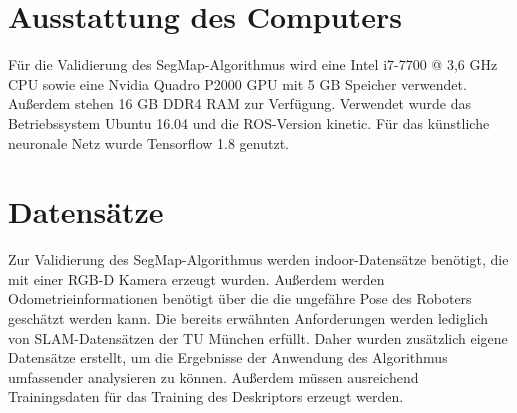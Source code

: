 
\section[Ausstattung des Computers (Kopp)]{Ausstattung des Computers}

Für die Validierung des SegMap-Algorithmus wird eine Intel i7-7700 @ 3,6 GHz CPU sowie eine Nvidia Quadro P2000 GPU mit 5 GB Speicher verwendet. Außerdem stehen 16 GB DDR4 RAM zur Verfügung. Verwendet wurde das Betriebssystem Ubuntu 16.04 und die ROS-Version kinetic. Für das künstliche neuronale Netz wurde Tensorflow 1.8 genutzt. 

\section[Datensätze (Schmelzer)]{Datensätze}
\label{sec:Datensatz}

Zur Validierung des SegMap-Algorithmus werden indoor-Datensätze benötigt, die mit einer RGB-D Kamera erzeugt wurden. Außerdem werden Odometrieinformationen benötigt über die die ungefähre Pose des Roboters geschätzt werden kann. Die bereits erwähnten Anforderungen werden lediglich von SLAM-Datensätzen der TU München erfüllt. Daher wurden zusätzlich eigene Datensätze erstellt, um die Ergebnisse der Anwendung des Algorithmus umfassender analysieren zu können. Außerdem müssen ausreichend Trainingsdaten für das Training des Deskriptors erzeugt werden. 

